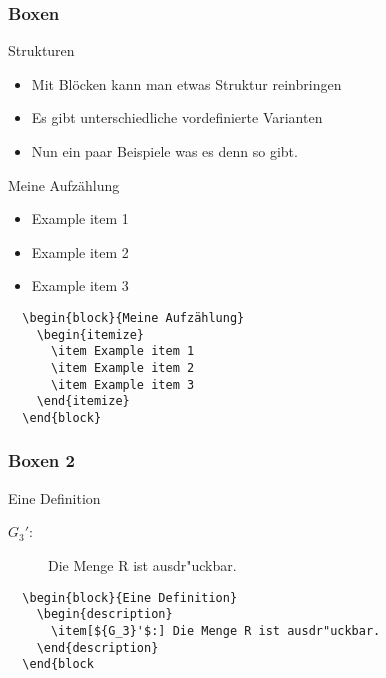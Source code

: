 \begin{frame}
  \frametitle{Boxen}
  \begin{block}{Strukturen}
    \begin{itemize}[<+->]
      \item Mit Blöcken kann man etwas Struktur reinbringen
      \item Es gibt unterschiedliche vordefinierte Varianten
      \item Nun ein paar Beispiele was es denn so gibt.
    \end{itemize}
  \end{block}
  \pause
  \begin{block}{Meine Aufzählung}
    \begin{itemize}
      \item Example item 1
      \item Example item 2
      \item Example item 3
    \end{itemize}
  \end{block}
\end{frame}
\begin{frame}[fragile]
  \begin{verbatim}
  \begin{block}{Meine Aufzählung}
    \begin{itemize}
      \item Example item 1
      \item Example item 2
      \item Example item 3
    \end{itemize}
  \end{block}
  \end{verbatim}
\end{frame}
\begin{frame}
  \frametitle{Boxen 2}
  \begin{block}{Eine Definition}
  \begin{description}
    \item[${G_3}'$:] Die Menge R ist ausdr"uckbar.
  \end{description}
  \end{block}
\end{frame}
\begin{frame}[fragile]
  \begin{verbatim}
  \begin{block}{Eine Definition}
    \begin{description}
      \item[${G_3}'$:] Die Menge R ist ausdr"uckbar.
    \end{description}
  \end{block
  \end{verbatim}
\end{frame}
